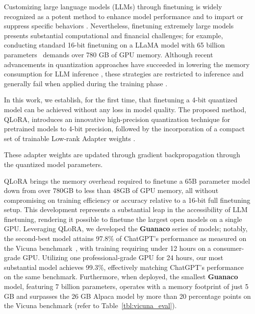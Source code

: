 Customizing large language models (LLMs) through finetuning is widely recognized as a potent method to enhance model performance \citep{min2021metaicl, wei2021finetuned, ouyang2022training, wang2022super, wang2022self, liu2022few} and to impart or suppress specific behaviors \citep{ouyang2022training,askell2021general,bai2022training}. Nevertheless, finetuning extremely large models presents substantial computational and financial challenges; for example, conducting standard 16-bit finetuning on a LLaMA model with 65 billion parameters~\citep{touvron2023llama} demands over 780 GB of GPU memory. Although recent advancements in quantization approaches have succeeded in lowering the memory consumption for LLM inference \citep{dettmers2022llm, dettmers2022case, frantar2022gptq, xiao2022smoothquant}, these strategies are restricted to inference and generally fail when applied during the training phase \citep{wortsman2023stable}.

In this work, we establish, for the first time, that finetuning a 4-bit quantized model can be achieved without any loss in model quality. The proposed method, \textsc{QLoRA}, introduces an innovative high-precision quantization technique for pretrained models to 4-bit precision, followed by the incorporation of a compact set of trainable Low-rank Adapter weights \citep{hu2021lora}.

These adapter weights are updated through gradient backpropagation through the quantized model parameters.

\textsc{QLoRA} brings the memory overhead required to finetune a 65B parameter model down from over $780$GB to less than $48$GB of GPU memory, all without compromising on training efficiency or accuracy relative to a 16-bit full finetuning setup. This development represents a substantial leap in the accessibility of LLM finetuning, rendering it possible to finetune the largest open models on a single GPU. Leveraging \textsc{QLoRA}, we developed the \textbf{Guanaco} series of models; notably, the second-best model attains 97.8\% of ChatGPT's performance as measured on the Vicuna benchmark~\citep{vicuna2023}, with training requiring under 12 hours on a consumer-grade GPU. Utilizing one professional-grade GPU for 24 hours, our most substantial model achieves 99.3\%, effectively matching ChatGPT’s performance on the same benchmark. Furthermore, when deployed, the smallest \textbf{Guanaco} model, featuring 7 billion parameters, operates with a memory footprint of just 5 GB and surpasses the 26 GB Alpaca model by more than 20 percentage points on the Vicuna benchmark (refer to Table~\ref{tbl:vicuna_eval}).

